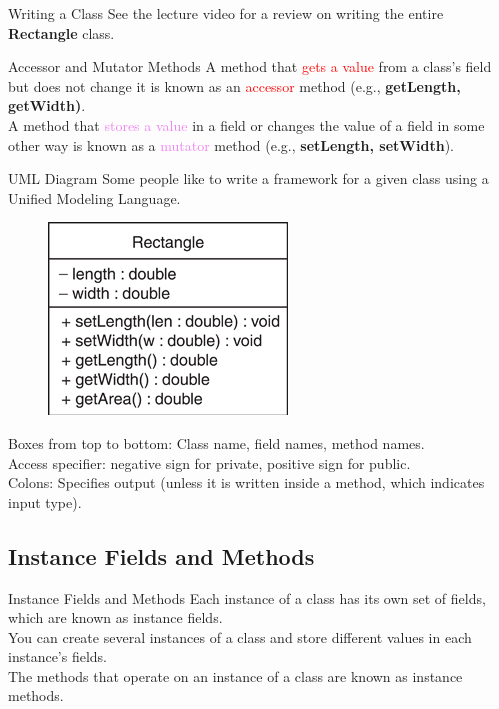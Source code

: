 \documentclass[11pt]{beamer}
\newcommand{\red}[1]{\textcolor{red}{#1}}
\newcommand{\violet}[1]{\textcolor{violet}{#1}}
\begin{document}
\begin{frame}{Writing a Class}
    See the lecture video for a review on writing the entire \textbf{Rectangle} class.
\end{frame}

\begin{frame}{Accessor and Mutator Methods}
    A method that \red{gets a value} from a class’s field but does not change it is known as an \red{accessor} method (e.g., \textbf{getLength, getWidth)}. \\ \vspace{1em}
    A method that \violet{stores a value} in a field or changes the value of a field in some other way is known as a \violet{mutator} method (e.g., \textbf{setLength, setWidth}).
\end{frame}

\begin{frame}{UML Diagram}
\footnotesize
    Some people like to write a framework for a given class using a Unified Modeling Language.
    \noindent 
    \begin{figure}[H]
    \centering
    \includegraphics[scale=0.9]{Images/chapter06_ModelLanguage.png}
    \end{figure}
    Boxes from top to bottom: Class name, field names, method names. \\ \vspace{1em}
    Access specifier: negative sign for private, positive sign for public. \\ \vspace{1em} 
    Colons: Specifies output (unless it is written inside a method, which indicates input type).
\end{frame}

\subsection{Instance Fields and Methods}
\begin{frame}{Instance Fields and Methods}
    Each instance of a class has its own set of fields, which are known as instance fields. \\ \vspace{1em} 
    You can create several instances of a class and store different values in each instance’s fields. \\ \vspace{1em} 
    The methods that operate on an instance of a class are known as instance methods.
\end{frame}
\end{document}
